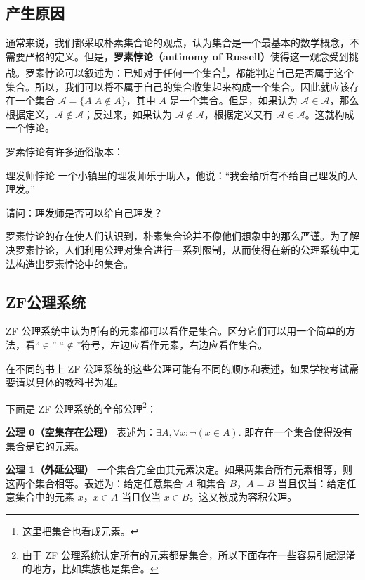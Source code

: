 \begin{issues}
\issueTODO
\end{issues}

\subsection{产生原因}
通常来说，我们都采取朴素集合论的观点，认为集合是一个最基本的数学概念，不需要严格的定义。但是，\textbf{罗素悖论（antinomy of Russell）}使得这一观念受到挑战。罗素悖论可以叙述为：已知对于任何一个集合\footnote{这里把集合也看成元素。}，都能判定自己是否属于这个集合。所以，我们可以将不属于自己的集合收集起来构成一个集合。因此就应该存在一个集合 $\mathcal{A}=\{A|A\notin A\}$，其中 $A$ 是一个集合。但是，如果认为 $\mathcal{A}\in\mathcal{A}$，那么根据定义，$\mathcal{A}\notin\mathcal{A}$；反过来，如果认为 $\mathcal{A}\notin\mathcal{A}$，根据定义又有 $\mathcal{A}\in\mathcal{A}$。这就构成一个悖论。

罗素悖论有许多通俗版本：
\begin{example}{理发师悖论}
一个小镇里的理发师乐于助人，他说：“我会给所有不给自己理发的人理发。”

请问：理发师是否可以给自己理发？
\end{example}

罗素悖论的存在使人们认识到，朴素集合论并不像他们想象中的那么严谨。为了解决罗素悖论，人们利用公理对集合进行一系列限制，从而使得在新的公理系统中无法构造出罗素悖论中的集合。

\subsection{ZF公理系统}
ZF 公理系统中认为所有的元素都可以看作是集合。区分它们可以用一个简单的方法，看“$\in$” “$\notin$”符号，左边应看作元素，右边应看作集合。

在不同的书上 ZF 公理系统的这些公理可能有不同的顺序和表述，如果学校考试需要请以具体的教科书为准。

下面是 ZF 公理系统的全部公理\footnote{由于 ZF 公理系统认定所有的元素都是集合，所以下面存在一些容易引起混淆的地方，比如集族也是集合。}：

\textbf{公理 0（空集存在公理）} 表述为：$\exists A,  \forall x: \neg ( x \in A).$ 即存在一个集合使得没有集合是它的元素。

\textbf{公理 1（外延公理）} 一个集合完全由其元素决定。如果两集合所有元素相等，则这两个集合相等。表述为：给定任意集合 $A$ 和集合 $B$，$A=B$ 当且仅当：给定任意集合中的元素 $x$，$x \in A$ 当且仅当 $x \in B$。这又被成为容积公理。

